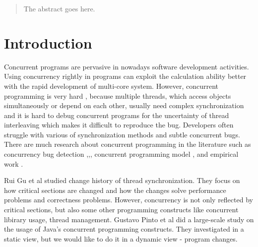\documentclass[conference]{IEEEtran}
\begin{document}




\maketitle

\begin{abstract}
The abstract goes here.
\end{abstract}





%
\IEEEpeerreviewmaketitle



\section{Introduction}
Concurrent programs are pervasive in nowadays software development activities. Using concurrency rightly in programs can exploit the calculation ability better with the rapid development of multi-core system. However, concurrent programming is very hard \cite{journals/corr/McKenney17},\cite{journals/queue/SutterL05} because multiple threads, which access objects simultaneously or depend on each other, usually need complex synchronization and it is hard to debug concurrent programs for the uncertainty of thread interleaving which makes it difficult to reproduce the bug. Developers often struggle with various of synchronization methods and subtle concurrent bugs. There are much research about concurrent programming in the literature such as concurrency bug detection \cite{conf/pldi/FlanaganF09},\cite{conf/kbse/KroeningPSW16},\cite{conf/pldi/FlanaganFY08}, concurrent programming model \cite{conf/java/Lea00},\cite{conf/oopsla/Bagherzadeh15} and empirical work \cite{conf/sosp/DavidGT13}.

Rui Gu et al \cite{conf/sigsoft/GuJSZL15} studied change history of thread synchronization. They focus on how critical sections are changed and how the changes solve performance problems and correctness problems. However, concurrency is not only reflected by critical sections, but also some other programming constructs like concurrent libirary usage, thread management. Gustavo Pinto et al \cite{journals/jss/PintoTFFB15} did a large-scale study on the usage of Java’s concurrent programming constructs. They investigated in a static view, but we would like to do it in a dynamic view - program changes.
\end{document}
